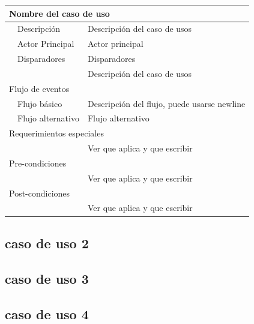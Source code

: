 \documentclass[12pt,a4paper, twosite]{article}
\begin{document}
\begin{tabular}{|p{}|p{}|p{}|p{}|}

\hline 
\multicolumn{4}{|p{\textwidth}|}{ Nombre del caso de uso} \\ \hline 
 & Descripción & \multicolumn{2}{|p{0.7\textwidth}|}{ Descripción del caso de usos}  \\ \hline 
 & Actor Principal & \multicolumn{2}{|p{0.7\textwidth}|}{Actor principal}  \\ \hline  
 & Disparadores & \multicolumn{2}{|p{0.7\textwidth}|}{ Disparadores}  \\ \hline 
 & &  \multicolumn{2}{|p{0.7\textwidth}|}{ Descripción del caso de usos}  \\ \hline  

\multicolumn{4}{|p{\textwidth}|}{ Flujo de eventos} \\ \hline 
& Flujo básico &\multicolumn{2}{|p{0.7\textwidth}|}{ Descripción del flujo, puede usarse newline}  \\ \hline  
& Flujo alternativo   &  \multicolumn{2}{|p{0.7\textwidth}|}{ Flujo alternativo}  \\ \hline  

 
\multicolumn{4}{|p{\textwidth}|}{ Requerimientos especiales } \\ \hline 
&  & \multicolumn{2}{|p{0.7\textwidth}|}{ Ver que aplica y que escribir}  \\ \hline  




\multicolumn{4}{|p{\textwidth}|}{ Pre-condiciones } \\ \hline 
&  & \multicolumn{2}{|p{0.7\textwidth}|}{ Ver que aplica y que escribir}  \\ \hline  


\hline 
\multicolumn{4}{|p{\textwidth}|}{ Post-condiciones } \\ \hline 

&  & \multicolumn{2}{|p{0.7\textwidth}|}{ Ver que aplica y que escribir}  \\ \hline  



\end{tabular}








\subsection{caso de uso 2 }

\subsection{caso de uso 3 }

\subsection{caso de uso 4 }

	
	
\end{document}
